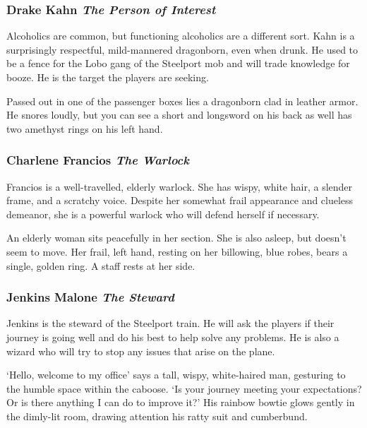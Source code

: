 \documentclass[letterpaper,10pt,twoside,twocolumn,openany]{dndbook}
\begin{document}
\subsubsection{Drake Kahn \textit{The Person of Interest}}
Alcoholics are common, but functioning alcoholics are a different sort.  Kahn is a surprisingly respectful, mild-mannered dragonborn, even when drunk.  He used to be a fence for the Lobo gang of the Steelport mob and will trade knowledge for booze.  He is the target the players are seeking.

\begin{quotebox}
Passed out in one of the passenger boxes lies a dragonborn clad in leather armor.  He snores loudly, but you can see a short and longsword on his back as well has two amethyst rings on his left hand.
\end{quotebox}

\subsubsection{Charlene Francios \textit{The Warlock}}
Francios is a well-travelled, elderly warlock.  She has wispy, white hair, a slender frame, and a scratchy voice.  Despite her somewhat frail appearance and clueless demeanor, she is a powerful warlock who will defend herself if necessary.

\begin{quotebox}
An elderly woman sits peacefully in her section.  She is also asleep, but doesn't seem to move.  Her frail, left hand, resting on her billowing, blue robes, bears a single, golden ring.  A staff rests at her side.
\end{quotebox}

\subsubsection{Jenkins Malone \textit{The Steward}}
Jenkins is the steward of the Steelport train.  He will ask the players if their journey is going well and do his best to help solve any problems.  He is also a wizard who will try to stop any issues that arise on the plane.

\begin{quotebox}
`Hello, welcome to my office' says a tall, wispy, white-haired man, gesturing to the humble space within the caboose.  `Is your journey meeting your expectations? Or is there anything I can do to improve it?'  His rainbow bowtie glows gently in the dimly-lit room, drawing attention his ratty suit and cumberbund. 
\end{quotebox}
\end{document}
